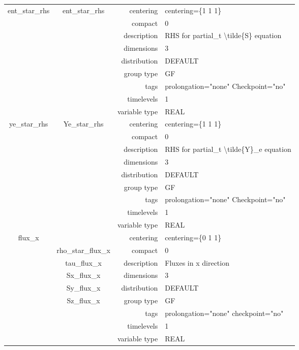 \documentclass{article}
\begin{document}
\begin{tabular*}{150mm}{|c|c@{\extracolsep{\fill}}|rl|}
\hline 
ent\_star\_rhs & ent\_star\_rhs & centering & centering=\{1 1 1\} \\ 
 &  & compact & 0 \\ 
 &  & description & RHS for partial\_t {\textbackslash}tilde\{S\} equation \\ 
 &  & dimensions & 3 \\ 
 &  & distribution & DEFAULT \\ 
 &  & group type & GF \\ 
 &  & tags & prolongation="none" Checkpoint="no" \\ 
 &  & timelevels & 1 \\ 
 &  & variable type & REAL \\ 
\hline 
ye\_star\_rhs & Ye\_star\_rhs & centering & centering=\{1 1 1\} \\ 
 &  & compact & 0 \\ 
 &  & description & RHS for partial\_t {\textbackslash}tilde\{Y\}\_e equation \\ 
 &  & dimensions & 3 \\ 
 &  & distribution & DEFAULT \\ 
 &  & group type & GF \\ 
 &  & tags & prolongation="none" Checkpoint="no" \\ 
 &  & timelevels & 1 \\ 
 &  & variable type & REAL \\ 
\hline 
flux\_x &  & centering & centering=\{0 1 1\} \\ 
 & rho\_star\_flux\_x & compact & 0 \\ 
 & tau\_flux\_x & description & Fluxes in x direction \\ 
 & Sx\_flux\_x & dimensions & 3 \\ 
 & Sy\_flux\_x & distribution & DEFAULT \\ 
 & Sz\_flux\_x & group type & GF \\ 
 &  & tags & prolongation="none" checkpoint="no" \\ 
 &  & timelevels & 1 \\ 
 &  & variable type & REAL \\ 
\hline 
\end{tabular*} 



\vspace{5mm}
\vspace{5mm}
\end{document}
